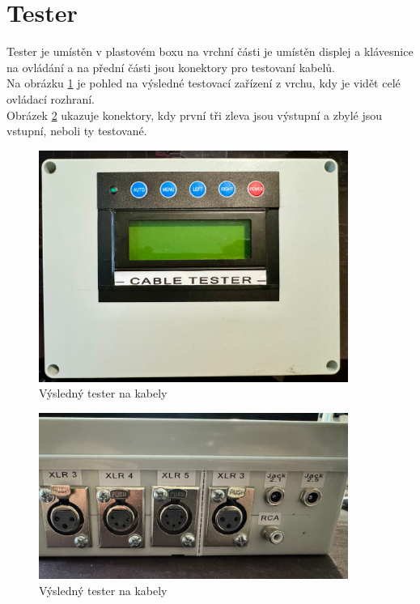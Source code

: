
\section{Tester}
Tester je umístěn v plastovém boxu na vrchní části je umístěn displej a klávesnice na ovládání a na přední části jsou konektory pro testovaní kabelů.\\

Na obrázku \ref{fig:tester}  je pohled na výsledné testovací zařízení z vrchu, kdy je vidět celé ovládací rozhraní.
\\
Obrázek \ref{fig:testerIO} ukazuje konektory, kdy první tři zleva jsou výstupní a zbylé jsou vstupní, neboli ty testované.

\begin{figure}[H]
	\centering
	\includegraphics[width=0.9\textwidth]{pictures/tester-top.jpeg}
    	\caption{Výsledný tester na kabely}
   	\label{fig:tester}
\end{figure}

\begin{figure}[H]
	\centering
	\includegraphics[width=0.9\textwidth]{pictures/tester-io.jpeg}
    	\caption{Výsledný tester na kabely}
   	\label{fig:testerIO}
\end{figure}

